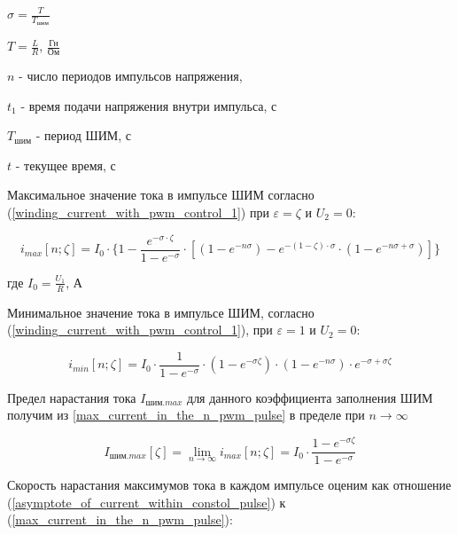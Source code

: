 $\sigma = \frac{ T }{ T_\textit{шим} }$

$T = \frac{ L }{ R }$, $\frac{\textit{Гн}}{\textit{Ом}}$

$n$ - число периодов импульсов напряжения,

$t_{1}$ - время подачи напряжения внутри импульса, с

$T_\textit{шим}$ - период ШИМ, с

$t$ - текущее время, с
\newline

Максимальное значение тока в импульсе ШИМ согласно (\ref{winding_current_with_pwm_control_1}) при
$\varepsilon = \zeta$ и $U_{2} = 0$:

\begin{equation}
    \label{max_current_in_the_n_pwm_pulse}
    i_{max}[n; \zeta] =
        I_{0}
            \cdot \{ 1
                     - \frac{ e^{-\sigma \cdot \zeta} }{ 1 - e^{-\sigma} }
                       \cdot [ (1 - e^{-n\sigma})
                               - e^{ -(1 - \zeta) \cdot \sigma }
                                    \cdot ( 1 - e^{-n\sigma + \sigma} )
                             ]
                  \}
\end{equation}

где $I_{0} = \frac{ U_{1} }{ R }$, А

Минимальное значение тока в импульсе ШИМ, согласно (\ref{winding_current_with_pwm_control_1}), при
$\varepsilon = 1$ и $U_{2} = 0$:

\begin{equation}
    \label{min_current_in_the_n_pwm_pulse}
    i_{min}[n; \zeta] =
        I_{0}
            \cdot \frac{ 1 }{ 1-e^{-\sigma} }
            \cdot (1 - e^{-\sigma\zeta})
            \cdot (1 - e^{-n\sigma})
            \cdot e^{-\sigma + \sigma\zeta}
\end{equation}

Предел нарастания тока $I_{\textit{шим}.max}$ для данного коэффициента заполнения ШИМ получим из
\ref{max_current_in_the_n_pwm_pulse} в пределе при $n \to \infty$

\begin{equation}
    \label{asymptote_of_current_within_constol_pulse}
    I_{\textit{шим}.max}[\zeta]=
        \lim_{n \to \infty} i_{max} [n; \zeta] =
            I_{0} \cdot \frac{ 1 - e^{-\sigma\zeta} }{ 1 - e^{-\sigma}}
\end{equation}

Скорость нарастания максимумов тока в каждом импульсе оценим как отношение
(\ref{asymptote_of_current_within_constol_pulse}) к (\ref{max_current_in_the_n_pwm_pulse}):

